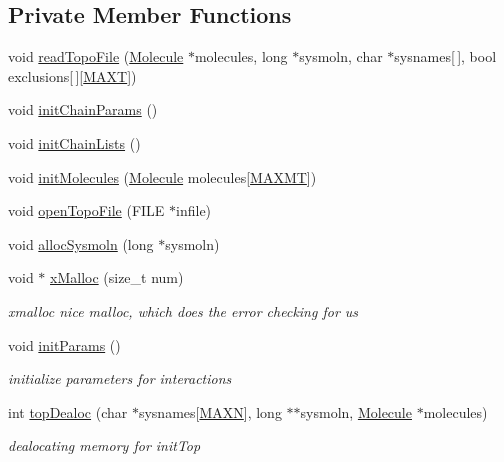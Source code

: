 \subsection*{Private Member Functions}
\begin{DoxyCompactItemize}
\item 
void \hyperlink{class_inicializer_acd2d40a23bdd29b973176c62ab5aef8d}{read\+Topo\+File} (\hyperlink{struct_molecule}{Molecule} $\ast$molecules, long $\ast$sysmoln, char $\ast$sysnames\mbox{[}$\,$\mbox{]}, bool exclusions\mbox{[}$\,$\mbox{]}\mbox{[}\hyperlink{macros_8h_a3f79fdecc884eb98c97d1bdc77455295}{M\+A\+X\+T}\mbox{]})
\item 
void \hyperlink{class_inicializer_a9dd91188a01b07c04f366428bcf2d545}{init\+Chain\+Params} ()
\item 
void \hyperlink{class_inicializer_a216a84344614d74a123f720beab18b62}{init\+Chain\+Lists} ()
\item 
void \hyperlink{class_inicializer_a3613cbdca3c53bb9992978c04a633d94}{init\+Molecules} (\hyperlink{struct_molecule}{Molecule} molecules\mbox{[}\hyperlink{macros_8h_ad002a98462c90c52983b122ab9e2059a}{M\+A\+X\+M\+T}\mbox{]})
\item 
void \hyperlink{class_inicializer_ae0b9e84765b73f78e05aa6c5e99dcc68}{open\+Topo\+File} (F\+I\+L\+E $\ast$infile)
\item 
void \hyperlink{class_inicializer_a1d3e25551f9a48a112d20e9680205d76}{alloc\+Sysmoln} (long $\ast$sysmoln)
\item 
void $\ast$ \hyperlink{class_inicializer_a271a0eef3110b4f1557c7b43d2e0320c}{x\+Malloc} (size\+\_\+t num)
\begin{DoxyCompactList}\small\item\em xmalloc nice malloc, which does the error checking for us \end{DoxyCompactList}\item 
void \hyperlink{class_inicializer_abd279f61f02c065e09384ed1a72831af}{init\+Params} ()
\begin{DoxyCompactList}\small\item\em initialize parameters for interactions \end{DoxyCompactList}\item 
int \hyperlink{class_inicializer_a64fa047683e35560283287c30e269f9a}{top\+Dealoc} (char $\ast$sysnames\mbox{[}\hyperlink{macros_8h_ad1f79d9d99776d7353c6659c307c83c6}{M\+A\+X\+N}\mbox{]}, long $\ast$$\ast$sysmoln, \hyperlink{struct_molecule}{Molecule} $\ast$molecules)
\begin{DoxyCompactList}\small\item\em dealocating memory for init\+Top \end{DoxyCompactList}\item 
$$
\end{DoxyCompactItemize}
